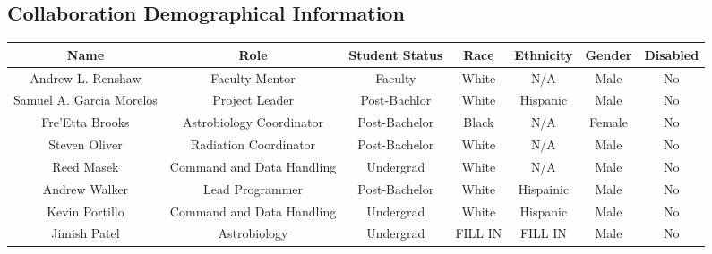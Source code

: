 \begin{appendices}
  \section{Collaboration Demographical Information}
\begin{table}[h!]
\centering  
  \begin{tabular}  {ccccccc}
      \textbf{Name} &  \textbf{Role} & \textbf{Student Status} & \textbf{Race} & \textbf{Ethnicity} & \textbf{Gender} & \textbf{Disabled}\\
 	\hline
	\hline
 	Andrew L. Renshaw & Faculty Mentor & Faculty & White & N/A & Male & No\\
 	\hline
 	Samuel A. Garcia Morelos & Project Leader & Post-Bachlor & White & Hispanic & Male & No\\
 	\hline
 	Fre'Etta Brooks & Astrobiology Coordinator & Post-Bachelor & Black & N/A & Female & No\\\hline
 	Steven Oliver & Radiation Coordinator & Post-Bachelor & White & N/A & Male & No\\\hline
 	Reed Masek & Command and Data Handling & Undergrad & White & N/A & Male & No\\\hline
 	Andrew Walker & Lead Programmer & Post-Bachelor & White & Hispainic & Male & No\\\hline
 	Kevin Portillo & Command and Data Handling & Undergrad & White & Hispanic & Male & No \\\hline
	Jimish Patel & Astrobiology & Undergrad & FILL IN & FILL IN & Male & No \\
	\end{tabular}	
	\end{table}  

\end{appendices}
